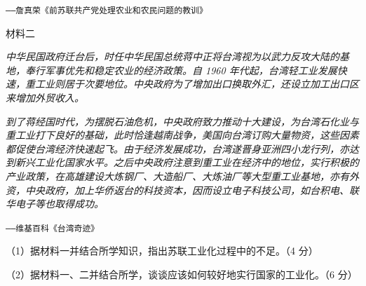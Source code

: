 \documentclass{ctexart}
\begin{document}
\begin{flushright}

\texttt{——詹真荣《前苏联共产党处理农业和农民问题的教训》}

\end{flushright}

\textsf{材料二}

\textit{中华民国政府迁台后，时任中华民国总统蒋中正将台湾视为以武力反攻大陆的基地，奉行军事优先和稳定农业的经济政策。自 1960 年代起，台湾轻工业发展快速，重工业则居于次要地位。中央政府为了增加出口换取外汇，还设立加工出口区来增加外贸收入。}

\textit{到了蒋经国时代，为摆脱石油危机，中央政府致力推动十大建设，为台湾石化业与重工业打下良好的基础，此时恰逢越南战争，美国向台湾订购大量物资，这些因素都促使台湾经济快速起飞。由于经济发展成功，台湾遂晋身亚洲四小龙行列，亦达到新兴工业化国家水平。之后中央政府注意到重工业在经济中的地位，实行积极的产业政策，在高雄建设大炼钢厂、大造船厂、大炼油厂等大型重工业基地，亦有外资，中央政府，加上华侨返台的科技资本，因而设立电子科技公司，如台积电、联华电子等也取得成功。}

\begin{flushright}

\texttt{——维基百科《台湾奇迹》}

\end{flushright}

（1）据材料一并结合所学知识，指出苏联工业化过程中的不足。（4 分）

（2）据材料一、二并结合所学，谈谈应该如何较好地实行国家的工业化。（6 分）
\end{document}
